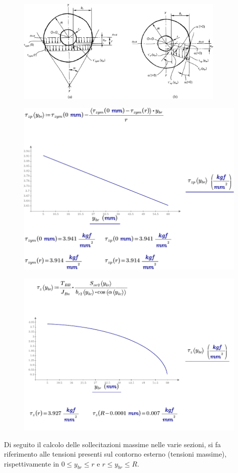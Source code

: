 \begin{figure}[H]
\centering
  \includegraphics[width=0.9\textwidth]{imgs/Cap7/SezAsse15}
\caption{}
\label{fig:SezAsse15}
\end{figure}
\begin{figure}[H]
\centering
  \includegraphics[width=.68\textwidth]{imgs/MathAsse8_0}
\caption{}
\label{fig:MathAsse8_0}
\end{figure}
\begin{figure}[H]
\centering
  \includegraphics[width=.68\textwidth]{imgs/MathAsse8_1}
\caption{}
\label{fig:MathAsse8_1}
\end{figure}
Di seguito il calcolo delle sollecitazioni massime nelle varie sezioni, si fa riferimento alle tensioni presenti sul contorno esterno (tensioni massime), rispettivamente in $0 \leq y_{br} \leq r $ e $ r \leq y_{br} \leq R$.
